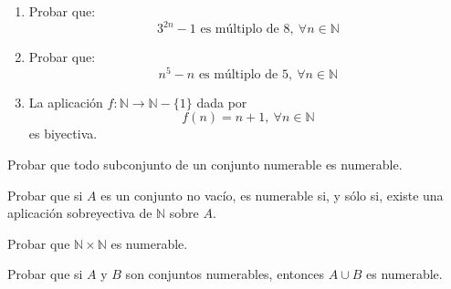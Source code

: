 \begin{ejercicio}
\begin{enumerate}
        \item Probar que:
        \begin{equation*}
           3^{2n}-1 \text{ es múltiplo de } 8, ~\forall n \in \mathbb{N}
        \end{equation*}

        \item Probar que:
        \begin{equation*}
           n^5-n \text{ es múltiplo de } 5, ~\forall n \in \mathbb{N}
        \end{equation*}

        \item La aplicación $f:\mathbb{N} \longrightarrow \mathbb{N}-\{1\}$ dada por
        \begin{equation*}
            f(n)=n+1,~\forall n \in \mathbb{N}
        \end{equation*}
        es biyectiva.
    \end{enumerate}
\end{ejercicio}


\begin{ejercicio}
    Probar que todo subconjunto de un conjunto numerable es numerable.
\end{ejercicio}

\begin{ejercicio}\label{ej:2.5.3}
    Probar que si $A$ es un conjunto no vacío, es numerable si, y sólo si, existe una aplicación sobreyectiva de $\mathbb{N}$ sobre $A$.
\end{ejercicio}

\begin{ejercicio}\label{ej:2.5.4}
    Probar que $\mathbb{N} \times \mathbb{N}$ es numerable.
\end{ejercicio}

\begin{ejercicio}
    Probar que si $A$ y $B$ son conjuntos numerables, entonces $A \cup B$ es numerable.
\end{ejercicio}